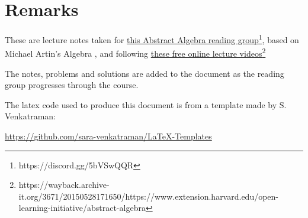 
\section*{Remarks}

These are lecture notes taken for \href{https://discord.gg/5bVSwQQR}{this Abstract Algebra reading group}\footnote{https://discord.gg/5bVSwQQR}, based on Michael Artin's Algebra \cite{artin2011algebra}, and following \href{https://wayback.archive-it.org/3671/20150528171650/https://www.extension.harvard.edu/open-learning-initiative/abstract-algebra}{these free online lecture videos}\footnote{https://wayback.archive-it.org/3671/20150528171650/https://www.extension.harvard.edu/open-learning-initiative/abstract-algebra}

The notes, problems and solutions are added to the document as the reading group progresses through the course.

The latex code used to produce this document is from a template made by S. Venkatraman: 

\href{https://github.com/sara-venkatraman/LaTeX-Templates?tab=MIT-1-ov-file}{https://github.com/sara-venkatraman/LaTeX-Templates}
